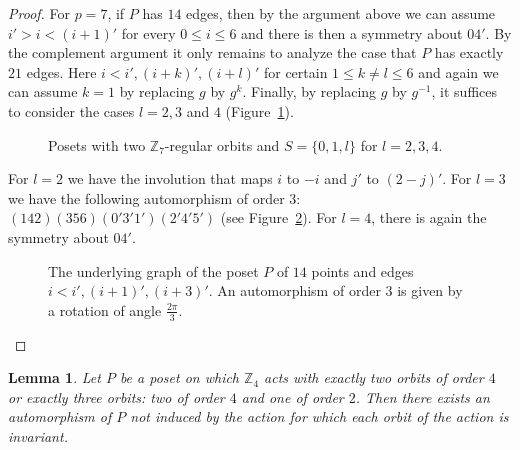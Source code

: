 \documentclass[10pt,a4paper]{amsart}
\newcommand{\Z}{\mathbb{Z}}
\theoremstyle{plain}
\newtheorem{lema}[cdrthm]{Lemma}
\theoremstyle{definition}
\theoremstyle{remark}
\begin{document}
\begin{proof}
For $p=7$, if $P$ has $14$ edges, then by the argument above we can assume $i'>i<(i+1)'$ for every $0\le i\le 6$ and there is then a symmetry about $04'$. By the complement argument it only remains to analyze the case that $P$ has exactly $21$ edges. Here $i<i',(i+k)', (i+l)'$ for certain $1\le k\neq l\le 6$ and again we can assume $k=1$ by replacing $g$ by $g^k$. Finally, by replacing $g$ by $g^{-1}$, it suffices to consider the cases $l=2,3$ and $4$ (Figure~\ref{figsietetres}).

\begin{figure}[h] 
\begin{center}



\caption{Posets with two $\Z_7$-regular orbits and $S=\{0,1,l\}$ for $l=2,3,4$.}\label{figsietetres}
\end{center}
\end{figure}

For $l=2$ we have the involution that maps $i$ to $-i$ and $j'$ to $(2-j)'$. For $l=3$ we have the following automorphism of order $3$: $(142)(356)(0'3'1')(2'4'5')$ (see Figure~\ref{triangulo}). For $l=4$, there is again the symmetry about $04'$. 
\begin{figure}[h] 
\begin{center}



\caption{The underlying graph of the poset $P$ of $14$ points and edges $i<i',(i+1)',(i+3)'$. An automorphism of order $3$ is given by a rotation of angle $\frac{2\pi}{3}$.}\label{triangulo}
\end{center}
\end{figure}
\end{proof}

\begin{lema} \label{nuevodificil}
Let $P$ be a poset on which $\Z_4$ acts with exactly two orbits of order $4$ or exactly three orbits: two  of order $4$ and one of order $2$. Then there exists an automorphism of $P$ not induced by the action for which each orbit of the action is invariant.
\end{lema}
\end{document}
